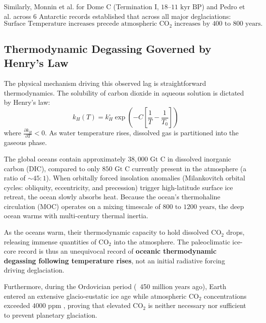 \documentclass[10pt,twocolumn]{article}
\begin{document}
Similarly, Monnin et al. \cite{Monnin2001} for Dome C (Termination I, $18\text{--}11\text{ kyr BP}$) and Pedro et al. \cite{Pedro2012} across 6 Antarctic records established that across all major deglaciations:
\begin{equation}
  \boxed{\text{Surface Temperature increases precede atmospheric } \text{CO}_2 \text{ increases by } 400 \text{ to } 800\text{ years}.}
\end{equation}


\subsection{Thermodynamic Degassing Governed by Henry's Law}

The physical mechanism driving this observed lag is straightforward thermodynamics. The solubility of carbon dioxide in aqueous solution is dictated by Henry's law:
\begin{equation}
  k_H(T) = k_H^\circ \exp\left( -C \left[\frac{1}{T} - \frac{1}{T_0}\right] \right)
\end{equation}
where $\frac{\partial k_H}{\partial T} < 0$. As water temperature rises, dissolved gas is partitioned into the gaseous phase.

The global oceans contain approximately $38,000\text{ Gt C}$ in dissolved inorganic carbon (DIC), compared to only $850\text{ Gt C}$ currently present in the atmosphere (a ratio of $\sim 45:1$). When orbitally forced insolation anomalies (Milankovitch orbital cycles: obliquity, eccentricity, and precession) trigger high-latitude surface ice retreat, the ocean slowly absorbs heat. Because the ocean's thermohaline circulation (MOC) operates on a mixing timescale of $800\text{ to }1200\text{ years}$, the deep ocean warms with multi-century thermal inertia.

As the oceans warm, their thermodynamic capacity to hold dissolved $\text{CO}_2$ drops, releasing immense quantities of $\text{CO}_2$ into the atmosphere. The paleoclimatic ice-core record is thus an unequivocal record of \textbf{oceanic thermodynamic degassing following temperature rises}, not an initial radiative forcing driving deglaciation.

Furthermore, during the Ordovician period (~450 million years ago), Earth entered an extensive glacio-eustatic ice age while atmospheric $\text{CO}_2$ concentrations exceeded $4000\text{ ppm}$ \cite{Sheehan2001}, proving that elevated $\text{CO}_2$ is neither necessary nor sufficient to prevent planetary glaciation.
\end{document}
